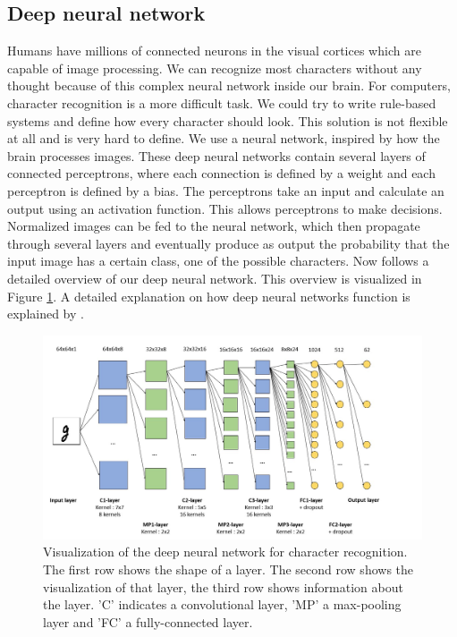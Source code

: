 \documentclass{article}
\begin{document}
\subsection{Deep neural network}
\label{sec:dnn}
Humans have millions of connected neurons in the visual cortices which are capable of image processing.
We can recognize most characters without any thought because of this complex neural network inside our brain.
For computers, character recognition is a more difficult task. We could try to write rule-based systems and define how every character should look. This solution is not flexible at all and is very hard to define.
We use a neural network, inspired by how the brain processes images. These deep neural networks contain several layers of connected perceptrons, where each connection is defined by a weight and each perceptron is defined by a bias.
The perceptrons take an input and calculate an output using an activation function. This allows perceptrons to make decisions.
Normalized images can be fed to the neural network, which then propagate through several layers and eventually produce as output the probability that the input image has a certain class, one of the possible characters.
Now follows a detailed overview of our deep neural network. This overview is visualized in Figure \ref{fig:dnn}. A detailed explanation on how deep neural networks function is explained by \cite{nnbook}.

\begin{figure}
  \centering
  \includegraphics[width=\textwidth]{images/dnn}
  \caption{Visualization of the deep neural network for character recognition. The first row shows the shape of a layer. The second row shows the visualization of that layer, the third row shows information about the layer. 'C' indicates a convolutional layer, 'MP' a max-pooling layer and 'FC' a fully-connected layer.}
  \label{fig:dnn}
\end{figure}
\end{document}
